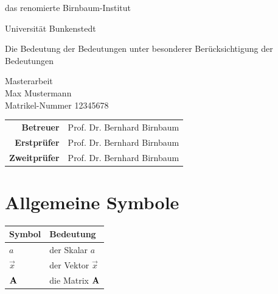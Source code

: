 
\pagestyle{empty} %

\clearscrheadings\clearscrplain
\begin{center}
\begin{Huge}
das renomierte Birnbaum-Institut\\
\vspace{3mm}
\end{Huge}
{\Large Universität Bunkenstedt}\\

\vspace{20mm}
\begin{Large}
Die Bedeutung der Bedeutungen unter besonderer Berücksichtigung der Bedeutungen\\
\end{Large}
\vspace{8mm}
Masterarbeit\\
\vspace{0.4cm}
\vspace{2 cm}
Max Mustermann \\
Matrikel-Nummer 12345678\\
\vspace{8cm}
\begin{tabular}{rl}
{\bfseries Betreuer} & Prof. Dr. Bernhard Birnbaum\\
{\bfseries Erstprüfer}&Prof. Dr. Bernhard Birnbaum\\
{\bfseries Zweitprüfer}&Prof. Dr. Bernhard Birnbaum\\
\end{tabular}

\end{center}
\clearpage


\pagestyle{useheadings} %

\tableofcontents %
\listoffigures %
\listoftables %

\label{s.sym} %
\section*{Allgemeine Symbole}\label{s.sym.alg}
\begin{flushleft}\begin{tabularx}{\textwidth}{l|X}
Symbol & Bedeutung\\\hline
$a$ & der Skalar $a$ \\
$\vec{x}$ & der Vektor $\vec{x}$\\
${\textbf{A}}$ & die Matrix ${\textbf{A}}$\\
\end{tabularx}\end{flushleft}




